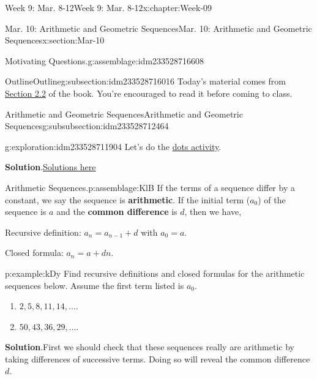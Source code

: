 \documentclass[oneside,10pt,]{book}
\newcommand{\blocktitlefont}{\relax}
\newcommand{\terminology}[1]{\textbf{#1}}
\numberwithin{equation}{section}
\begin{document}
\begin{chapterptx}{Week 9: Mar. 8-12}{}{Week 9: Mar. 8-12}{}{}{x:chapter:Week-09}
\begin{sectionptx}{Mar. 10: Arithmetic and Geometric Sequences}{}{Mar. 10: Arithmetic and Geometric Sequences}{}{}{x:section:Mar-10}
\begin{introduction}{}
\begin{assemblage}{Motivating Questions.}{g:assemblage:idm233528716608}
\begin{enumerate}
\end{enumerate}
%
\end{assemblage}
\end{introduction}%
%
%
\typeout{************************************************}
\typeout{************************************************}
%
\begin{subsectionptx}{Outline}{}{Outline}{}{}{g:subsection:idm233528716016}
Today's material comes from \href{http://discrete.openmathbooks.org/dmoi3/sec_seq-arithgeom.html}{Section 2.2} of the book. You're encouraged to read it before coming to class.%
%
%
\typeout{************************************************}
\typeout{************************************************}
%
\begin{subsubsectionptx}{Arithmetic and Geometric Sequences}{}{Arithmetic and Geometric Sequences}{}{}{g:subsubsection:idm233528712464}
\begin{exploration}{}{g:exploration:idm233528711904}%
Let's do the \href{./Activity07-DotsToSequences.pdf}{dots activity}.%
\par\smallskip%
\noindent\textbf{\blocktitlefont Solution}.\hypertarget{g:solution:idm233528710448}{}\quad{}\href{./Activity07-DotsToSequences-solutions.pdf}{Solutions here}\end{exploration}%
\begin{assemblage}{Arithmetic Sequences.}{p:assemblage:KlB}%
If the terms of a sequence differ by a constant, we say the sequence is \terminology{arithmetic}. If the initial term (\(a_0\)) of the sequence is \(a\) and the \terminology{common difference} is \(d\), then we have,%
\par
Recursive definition: \(a_n = a_{n-1} + d\) with \(a_0 = a\).%
\par
Closed formula: \(a_n = a + dn\).%
\end{assemblage}
\begin{example}{}{p:example:kDy}%
Find recursive definitions and closed formulas for the arithmetic sequences below. Assume the first term listed is \(a_0\).%
\par
%
\begin{enumerate}
\item{}\(2, 5, 8, 11, 14, \ldots\).%
\item{}\(50, 43, 36, 29, \ldots\).%
\end{enumerate}
%
\par\smallskip%
\noindent\textbf{\blocktitlefont Solution}.\hypertarget{p:solution:hIS}{}\quad{}First we should check that these sequences really are arithmetic by taking differences of successive terms. Doing so will reveal the common difference \(d\).%

\end{example}
\end{subsubsectionptx}
\end{subsectionptx}
\end{sectionptx}
\end{chapterptx}
\end{document}
